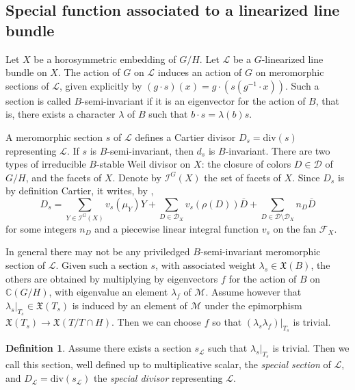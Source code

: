 \documentclass{amsart}
\theoremstyle{definition}
\newtheorem{defn}[thm]{Definition}
\begin{document}
\subsection{Special function associated to a linearized line bundle}

\label{subsec_special_function}

Let $X$ be a horosymmetric embedding of $G/H$.
Let $\mathcal{L}$ be a $G$-linearized line bundle on $X$. 
The action of $G$ on $\mathcal{L}$ induces an action of $G$ on 
meromorphic sections of $\mathcal{L}$, given explicitly by 
$(g\cdot s)(x)=g\cdot (s(g^{-1}\cdot x))$. Such a section is called 
$B$-semi-invariant if it is an eigenvector for the action of $B$, 
that is, there exists a character $\lambda$ of $B$ such that 
$b\cdot s=\lambda(b)s$.

A meromorphic section $s$ of $\mathcal{L}$ defines a Cartier divisor 
$D_s=\mathrm{div}(s)$ representing $\mathcal{L}$. If $s$ is 
$B$-semi-invariant, then $d_s$ is $B$-invariant.
There are two types of irreducible $B$-stable Weil divisor 
on $X$: the closure of colors $D\in \mathcal{D}$ of $G/H$, and the 
facets of $X$. 
Denote by $\mathcal{I}^G(X)$ the set of facets of $X$.
Since $D_s$ is by definition Cartier, it writes, by \cite[Proposition 3.1]{Bri89},
\[
D_s=\sum_{Y\in \mathcal{I}^G(X)} v_s(\mu_Y) Y + \sum_{D\in \mathcal{D}_X} v_s(\rho(D)) \overline{D} 
+\sum_{D\in \mathcal{D}\setminus \mathcal{D}_X}n_D \overline{D}
\]
for some integers $n_D$ and a piecewise linear integral function $v_s$ 
on the fan $\mathcal{F}_X$. 

In general there may not be any priviledged $B$-semi-invariant 
meromorphic section of $\mathcal{L}$. Given such a section $s$, 
with associated weight $\lambda_s \in \mathfrak{X}(B)$, the others 
are obtained by multiplying by eigenvectors $f$ for the action 
of $B$ on $\mathbb{C}(G/H)$, with eigenvalue an element 
$\lambda_f$ of $\mathcal{M}$.
Assume however that $\lambda_s|_{T_s}\in \mathfrak{X}(T_s)$ is 
induced by an element of $\mathcal{M}$ under the epimorphism 
$\mathfrak{X}(T_s)\rightarrow \mathfrak{X}(T/T\cap H)$. Then 
we can choose $f$ so that $(\lambda_s\lambda_f)|_{T_s}$ is trivial. 

\begin{defn}
Assume there exists a section $s_{\mathcal{L}}$ such that 
$\lambda_s|_{T_s}$ is trivial.
Then we call this section, 
well defined up to multiplicative scalar, 
the \emph{special section} of $\mathcal{L}$, and 
$D_{\mathcal{L}}=\mathrm{div}(s_{\mathcal{L}})$ the 
\emph{special divisor} representing $\mathcal{L}$.
\end{defn}
\end{document}
